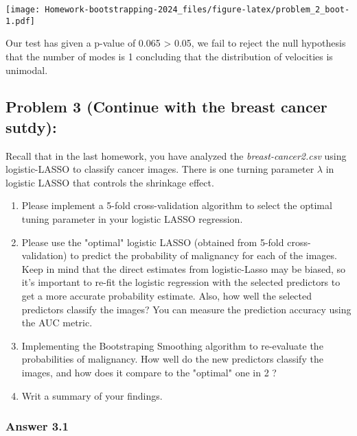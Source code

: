 \documentclass[
]{article}
\begin{document}
\texttt{[image: Homework-bootstrapping-2024\_files/figure-latex/problem\_2\_boot-1.pdf]}

Our test has given a p-value of 0.065 \textgreater{} 0.05, we fail to
reject the null hypothesis that the number of modes is 1 concluding that
the distribution of velocities is unimodal.

\hypertarget{problem-3-continue-with-the-breast-cancer-sutdy}{%
\subsection{Problem 3 (Continue with the breast cancer
sutdy):}\label{problem-3-continue-with-the-breast-cancer-sutdy}}

Recall that in the last homework, you have analyzed the
\textit{breast-cancer2.csv} using logistic-LASSO to classify cancer
images. There is one turning parameter \(\lambda\) in logistic LASSO
that controls the shrinkage effect.

\begin{enumerate}
\item Please implement a 5-fold cross-validation algorithm to select the optimal tuning parameter in your logistic LASSO regression.

\item Please use the "optimal" logistic LASSO (obtained from 5-fold cross-validation) to predict the probability of malignancy for each of the images. Keep in mind that the direct estimates from logistic-Lasso may be biased, so it's important to re-fit the logistic regression with the selected predictors to get a more accurate probability estimate. Also, how well the selected predictors classify the images? You can measure  the prediction accuracy using the AUC metric.

\item Implementing the Bootstraping Smoothing algorithm to re-evaluate the probabilities of malignancy. How well do the new predictors classify the images, and how does it compare to the "optimal" one in 2 ?

\item Writ a summary of your findings.
\end{enumerate}

\hypertarget{answer-3.1}{%
\subsubsection{Answer 3.1}\label{answer-3.1}}
\end{document}
